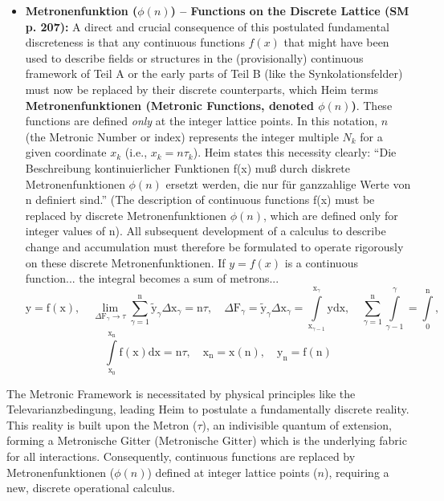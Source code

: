 \documentclass[12pt]{article}
\newcommand{\q}[1]{\enquote{#1}}
\newcommand{\metron}{\tau}
\newcommand{\metronischegitter}{\text{Metronische Gitter}}
\newcommand{\metronenfunktion}{\phi(n)}
\newcommand{\metronenziffer}{n}
\begin{document}
\begin{itemize}
    \item \textbf{Metronenfunktion (\( \metronenfunktion \)) – Functions on the Discrete Lattice (SM p. 207):}
    A direct and crucial consequence of this postulated fundamental discreteness is that any continuous functions \( f(x) \) that might have been used to describe fields or structures in the (provisionally) continuous framework of Teil A or the early parts of Teil B (like the Synkolationsfelder) must now be replaced by their discrete counterparts, which Heim terms \textbf{Metronenfunktionen (Metronic Functions, denoted \( \metronenfunktion \))}. These functions are defined \textit{only} at the integer lattice points. In this notation, \( \metronenziffer \) (the Metronic Number or index) represents the integer multiple \( N_k \) for a given coordinate \( x_k \) (i.e., \(x_k = n \tau_k\)). Heim states this necessity clearly: \q{Die Beschreibung kontinuierlicher Funktionen f(x) muß durch diskrete Metronenfunktionen \( \phi(n) \) ersetzt werden, die nur für ganzzahlige Werte von n definiert sind.} (The description of continuous functions f(x) must be replaced by discrete Metronenfunktionen \( \phi(n) \), which are defined only for integer values of n). All subsequent development of a calculus to describe change and accumulation must therefore be formulated to operate rigorously on these discrete Metronenfunktionen.
    If \( y = f(x) \) is a continuous function... the integral becomes a sum of metrons...
    \begin{equation}
    \mathrm{y} = \mathrm{f}(\mathrm{x}), \quad \lim_{\Delta\mathrm{F}_\gamma \to \tau} \sum_{\gamma=1}^\mathrm{n} \tilde{\mathrm{y}}_\gamma \Delta\mathrm{x}_\gamma = \mathrm{n}\tau, \quad \Delta\mathrm{F}_\gamma = \tilde{\mathrm{y}}_\gamma \Delta\mathrm{x}_\gamma = \int\limits_{\mathrm{x}_{\gamma-1}}^{\mathrm{x}_\gamma} \mathrm{y} \mathrm{dx}, \quad \sum_{\gamma=1}^\mathrm{n} \int\limits_{\gamma-1}^\gamma = \int\limits_0^\mathrm{n} , \tag{66}
    \end{equation}
    \[ \int\limits_{\mathrm{x}_0}^{\mathrm{x_n}} \mathrm{f}(\mathrm{x})\mathrm{dx} = \mathrm{n}\tau, \quad \mathrm{x_n} = \mathrm{x}(\mathrm{n}), \quad \mathrm{y_n} = \mathrm{f}(\mathrm{n}) \]
\end{itemize}

The Metronic Framework is necessitated by physical principles like the Televarianzbedingung, leading Heim to postulate a fundamentally discrete reality. This reality is built upon the Metron (\(\metron\)), an indivisible quantum of extension, forming a Metronische Gitter (\(\metronischegitter\)) which is the underlying fabric for all interactions. Consequently, continuous functions are replaced by Metronenfunktionen (\(\metronenfunktion\)) defined at integer lattice points (\(\metronenziffer\)), requiring a new, discrete operational calculus.
\end{document}

